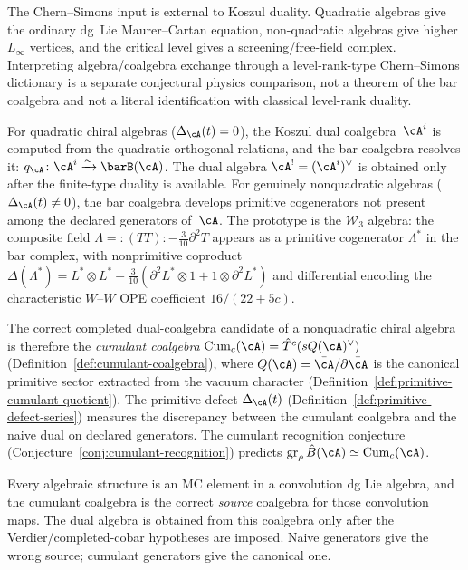 The Chern--Simons input is external to Koszul duality.  Quadratic
algebras give the ordinary dg~Lie Maurer--Cartan equation,
non-quadratic algebras give higher $L_\infty$ vertices, and the
critical level gives a screening/free-field complex.  Interpreting
algebra/coalgebra exchange through a level-rank-type
Chern--Simons dictionary is a separate conjectural physics comparison,
not a theorem of the bar coalgebra and not a literal identification
with classical level-rank duality.

\begin{remark}
\label{rem:cumulant-dual-nonquadratic}
For quadratic chiral algebras ($\Delta_\cA(t) = 0$), the Koszul
dual coalgebra~$\cA^i$ is computed from the quadratic orthogonal
relations, and the bar coalgebra resolves it:
$q_\cA\colon\cA^i\xrightarrow{\sim}\barB(\cA)$.  The dual algebra
$\cA^!=(\cA^i)^\vee$ is obtained only after the finite-type duality
is available. For genuinely nonquadratic algebras
($\Delta_\cA(t) \neq 0$), the bar coalgebra develops primitive
cogenerators not present among the declared generators of~$\cA$.
The prototype is the $\mathcal{W}_3$ algebra: the composite field
$\Lambda = :(TT): - \tfrac{3}{10}\partial^2 T$ appears as a
primitive cogenerator $\Lambda^*$ in the bar complex, with nonprimitive
coproduct $\Delta(\Lambda^*) = L^* \otimes L^* - \tfrac{3}{10}
(\partial^2 L^* \otimes 1 + 1 \otimes \partial^2 L^*)$ and
differential encoding the characteristic $W$--$W$ OPE coefficient
$16/(22 + 5c)$.

The correct completed dual-coalgebra candidate of a nonquadratic
chiral algebra is therefore the \emph{cumulant coalgebra}
$\operatorname{Cum}_c(\cA) = \hat{T}^c(sQ(\cA)^\vee)$
(Definition~\ref{def:cumulant-coalgebra}), where $Q(\cA) =
\bar{\cA}/\partial\bar{\cA}$ is the canonical primitive sector
extracted from the vacuum character
(Definition~\ref{def:primitive-cumulant-quotient}). The primitive
defect $\Delta_\cA(t)$
(Definition~\ref{def:primitive-defect-series}) measures the
discrepancy between the cumulant coalgebra and the naive dual on
declared generators. The cumulant recognition conjecture
(Conjecture~\ref{conj:cumulant-recognition}) predicts
$\operatorname{gr}_\rho \hat{B}(\cA) \simeq
\operatorname{Cum}_c(\cA)$.

Every algebraic structure is an MC element in
a convolution dg Lie algebra, and the cumulant coalgebra is the
correct \emph{source} coalgebra for those convolution maps.  The
dual algebra is obtained from this coalgebra only after the
Verdier/completed-cobar hypotheses are imposed. Naive generators give
the wrong source; cumulant generators give the canonical one.
\end{remark}

